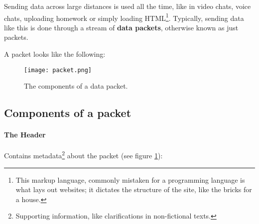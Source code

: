 \documentclass[../main.tex]{subfiles}
\begin{document}
Sending data across large distances is used all the time, like in video chats, voice chats, uploading homework or simply loading HTML\footnote{This markup language, commonly mistaken for a programming language is what lays out websites; it dictates the structure of the site, like the bricks for a house.}. Typically, sending data like this is done through a stream of \textbf{data packets}, otherwise known as just packets.

A packet looks like the following:

\begin{figure}[h]
    \centering
    \texttt{[image: packet.png]}
    \caption{The components of a data packet.}
    \label{fig:packet}
\end{figure}

\subsection{Components of a packet}

\paragraph{The Header}

Contains metadata\footnote{Supporting information, like clarifications in non-fictional texts.} about the packet (see figure \ref{fig:packet}):
\end{document}
